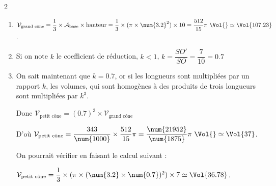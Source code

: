 \begin{corrige}
    \phantom{rrr}
    \begin{spacing}2
    \begin{enumerate}
        \item $\mathcal{V}_{\text{grand cône}} = \dfrac{1}{3}\times \mathcal{A}_{\text{base}}\times \text{hauteur} = \dfrac{1}{3}\times (\pi\times \num{3.2}^2) \times 10 = \dfrac{512}{15}\pi~\Vol{} \simeq \Vol{107.23}$.
        \item Si on note $k$ le coefficient de réduction, $k<1$, $k = \dfrac{SO'}{SO} = \dfrac{7}{10} = \num{0.7}$
        \item On sait maintenant que $k=\num{0.7}$, or si les longueurs sont multipliées par un rapport $k$, les volumes, qui sont homogènes à 
        des produits de trois longueurs sont multipliées par $k^3$.

        Donc $\mathcal{V}_{\text{petit cône}} = (\num{0.7})^3\times \mathcal{V}_{\text{grand cône}}$

        D'où $\mathcal{V}_{\text{petit cône}} = \dfrac{343}{\num{1000}}\times \dfrac{512}{15}\pi = \dfrac{\num{21952}}{\num{1875}}\pi~\Vol{} \simeq \Vol{37}$.


        \medskip
        On pourrait vérifier en faisant le calcul suivant :

        $\mathcal{V}_{\text{petit cône}} = \dfrac{1}{3}\times (\pi\times (\num{3.2}\times \num{0.7})^2) \times 7 \simeq \Vol{36.78}$.
    \end{enumerate}
    \end{spacing}

\end{corrige}

